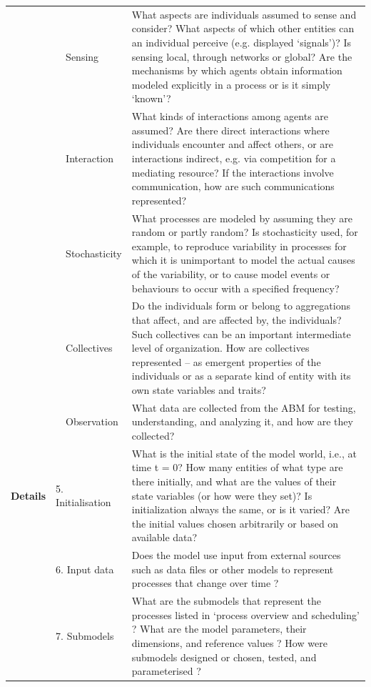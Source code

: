 \begin{table}[H]
{\begin{tabular}{|p{1.05cm}|p{1.15cm}|p{1.25cm}|p{10cm}|}
		&  & Sensing & What aspects are individuals assumed to sense and consider? What aspects of which other entities can an individual perceive (e.g. displayed ‘signals’)? Is sensing local, through networks or global? Are the mechanisms by which agents obtain information modeled explicitly in a process or is it simply ‘known’? \\ \cline{3-4} 
		&  & Interaction & What kinds of interactions among agents are assumed? Are there direct interactions where individuals encounter and affect others, or are interactions indirect, e.g. via competition for a mediating resource? If the interactions involve communication, how are such communications represented? \\ \cline{3-4} 
		&  & Stochasticity & What processes are modeled by assuming they are random or partly random? Is stochasticity used, for example, to reproduce variability in processes for which it is unimportant to model the actual causes of the variability, or to cause model events or behaviours to occur with a specified frequency? \\ \cline{3-4} 
		&  & Collectives & Do the individuals form or belong to aggregations that affect, and are affected by, the individuals? Such collectives can be an important intermediate level of organization. How are collectives represented – as emergent properties of the individuals or as a separate kind of entity with its own state variables and traits? \\ \cline{3-4} 
		&  & Observation & What data are collected from the ABM for testing, understanding, and analyzing it, and how are they collected? \\ \hline
		\textbf{Details} & \multicolumn{2}{l|}{5. Initialisation} & What is the initial state of the model world, i.e., at time t = 0? How many entities of what type are there initially, and what are the values of their state variables (or how were they set)? Is initialization always the same, or is it varied? Are the initial values chosen arbitrarily or based on available data? \\ \hline
		& \multicolumn{2}{l|}{6. Input data} & Does the model use input from external sources such as data files or other models to represent processes that change over time ? \\ \cline{2-4} 
		& \multicolumn{2}{l|}{7. Submodels} & What are the submodels that represent the processes listed in ‘process overview and scheduling’ ? What are the model parameters, their dimensions, and reference values ? How were submodels designed or chosen, tested, and parameterised ? \\ \hline
	\end{tabular}}
\end{table}

